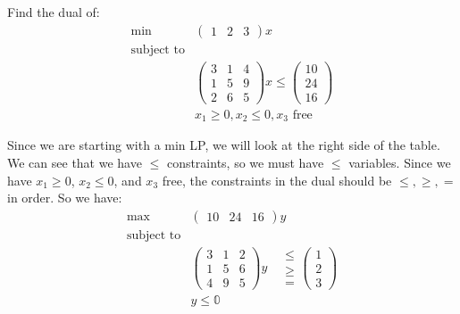 \documentclass[a4paper]{report}
\newcommand{\m}[1]{\begin{pmatrix}
	#1
\end{pmatrix}}
\begin{document}
	\begin{eg}
		\label{eg} Find the dual of: \\
		\begin{equation*}
			\begin{aligned}
				\min              & \m{1 & 2 & 3}x                                                   \\
				\text{subject to} &                                                                  \\
				                  & \m{3 & 1 & 4 \\ 1 & 5 & 9 \\ 2 & 6 & 5}x \leq \m{10 \\ 24 \\ 16} \\
				                  & x_{1} \geq 0, x_{2} \leq 0, x_{3} \text{ free}
			\end{aligned}
		\end{equation*}
		\begin{answer}
			Since we are starting with a min LP, we will look at the right side of the
			table. We can see that we have $\leq$ constraints, so we must have $\leq$
			variables. Since we have $x_{1} \geq 0$, $x_{2} \leq 0$, and $x_{3}$ free,
			the constraints in the dual should be $\leq, \geq, =$ in order. So we have:
			\begin{equation*}
				\begin{aligned}
					\max              & \m{10 & 24 & 16}y                                                                                          \\
					\text{subject to} &                                                                                                            \\
					                  & \m{3 & 1 & 2 \\ 1 & 5 & 6 \\ 4 & 9 & 5}y \quad \begin{matrix}\leq \\ \geq \\ =\end{matrix} \m{1 \\ 2 \\ 3} \\
					                  & y \leq \mathbb{0}
				\end{aligned}
			\end{equation*}
		\end{answer}
	\end{eg}
\end{document}
